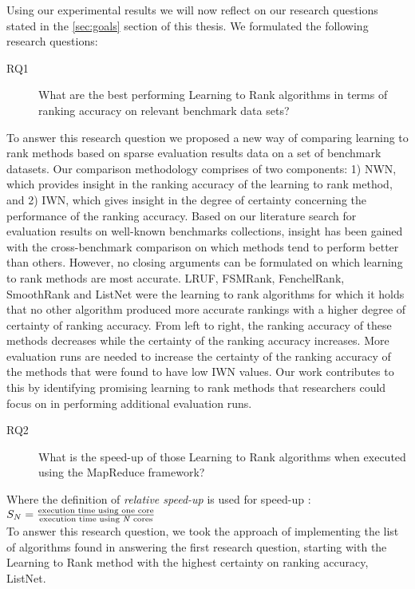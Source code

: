 Using our experimental results we will now reflect on our research questions stated in the \ref{sec:goals} section of this thesis. We formulated the following research questions:
\begin{description}
\item[RQ1] What are the best performing Learning to Rank algorithms in terms of ranking accuracy on relevant benchmark data sets?
\end{description}
To answer this research question we proposed a new way of comparing learning to rank methods based on sparse evaluation results data on a set of benchmark datasets. Our comparison methodology comprises of two components: 1) \ac{NWN}, which provides insight in the ranking accuracy of the learning to rank method, and 2) \ac{IWN}, which gives insight in the degree of certainty concerning the performance of the ranking accuracy. Based on our literature search for evaluation results on well-known benchmarks collections, insight has been gained with the cross-benchmark comparison on which methods tend to perform better than others. However, no closing arguments can be formulated on which learning to rank methods are most accurate. LRUF, FSMRank, FenchelRank, SmoothRank and ListNet were the learning to rank algorithms for which it holds that no other algorithm produced more accurate rankings with a higher degree of certainty of ranking accuracy. From left to right, the ranking accuracy of these methods decreases while the certainty of the ranking accuracy increases. More evaluation runs are needed to increase the certainty of the ranking accuracy of the methods that were found to have low \ac{IWN} values. Our work contributes to this by identifying promising learning to rank methods that researchers could focus on in performing additional evaluation runs.

\begin{description}
\item[RQ2] What is the speed-up of those Learning to Rank algorithms when executed using the MapReduce framework?
\end{description}
\bigskip
Where the definition of \emph{relative speed-up} is used for speed-up \cite{Sun1991}:\\

$S_N = \frac{\text{execution time using one core}}{\text{execution time using \emph{N} cores}}$\\

To answer this research question, we took the approach of implementing the list of algorithms found in answering the first research question, starting with the Learning to Rank method with the highest certainty on ranking accuracy, ListNet.\\

